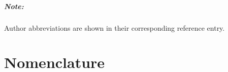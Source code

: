 \paragraph{Note:} Author abbreviations are shown in their corresponding reference entry.

\setlength{\glsdescwidth}{0.5\textwidth}
\setlength{\glspagelistwidth}{0.1\textwidth}
\cleardoublepage

\chapter*{Nomenclature}
\printglossary[type=main,title={}]
\vspace{1cm}

\glsresetall

\cleardoublepage
